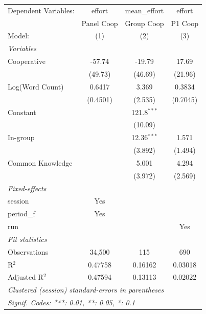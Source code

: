 
\begingroup
\centering
\begin{tabular}{lccc}
   \tabularnewline \midrule \midrule
   Dependent Variables: & effort     & mean\_effort  & effort\\  
                        & Panel Coop & Group Coop    & P1 Coop \\   
   Model:               & (1)        & (2)           & (3)\\  
   \midrule
   \emph{Variables}\\
   Cooperative          & -57.74     & -19.79        & 17.69\\   
                        & (49.73)    & (46.69)       & (21.96)\\   
   Log(Word Count)      & 0.6417     & 3.369         & 0.3834\\   
                        & (0.4501)   & (2.535)       & (0.7045)\\   
   Constant             &            & 121.8$^{***}$ &   \\   
                        &            & (10.09)       &   \\   
   In-group             &            & 12.36$^{***}$ & 1.571\\   
                        &            & (3.892)       & (1.494)\\   
   Common Knowledge     &            & 5.001         & 4.294\\   
                        &            & (3.972)       & (2.569)\\   
   \midrule
   \emph{Fixed-effects}\\
   session              & Yes        &               & \\  
   period\_f            & Yes        &               & \\  
   run                  &            &               & Yes\\  
   \midrule
   \emph{Fit statistics}\\
   Observations         & 34,500     & 115           & 690\\  
   R$^2$                & 0.47758    & 0.16162       & 0.03018\\  
   Adjusted R$^2$       & 0.47594    & 0.13113       & 0.02022\\  
   \midrule \midrule
   \multicolumn{4}{l}{\emph{Clustered (session) standard-errors in parentheses}}\\
   \multicolumn{4}{l}{\emph{Signif. Codes: ***: 0.01, **: 0.05, *: 0.1}}\\
\end{tabular}
\par\endgroup


